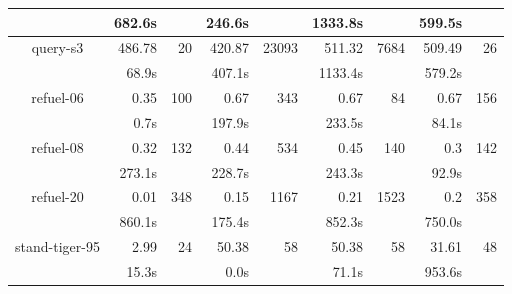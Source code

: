 \begin{table}
\begin{tabular}{|c|rr|rr|rr|rr|}
 & 682.6s & & 246.6s & & 1333.8s & & 599.5s & \\
\hline
query-s3 & 486.78 & 20 & 420.87 & 23093 & 511.32 & 7684 & 509.49 & 26 \\
 & 68.9s & & 407.1s & & 1133.4s & & 579.2s & \\
\hline
refuel-06 & 0.35 & 100 & 0.67 & 343 & 0.67 & 84 & 0.67 & 156 \\
 & 0.7s & & 197.9s & & 233.5s & & 84.1s & \\
\hline
refuel-08 & 0.32 & 132 & 0.44 & 534 & 0.45 & 140 & 0.3 & 142 \\
 & 273.1s & & 228.7s & & 243.3s & & 92.9s & \\
\hline
refuel-20 & 0.01 & 348 & 0.15 & 1167 & 0.21 & 1523 & 0.2 & 358 \\
 & 860.1s & & 175.4s & & 852.3s & & 750.0s & \\
\hline
stand-tiger-95 & 2.99 & 24 & 50.38 & 58 & 50.38 & 58 & 31.61 & 48 \\
 & 15.3s & & 0.0s & & 71.1s & & 953.6s & \\
\hline
\end{tabular}
\end{table}

